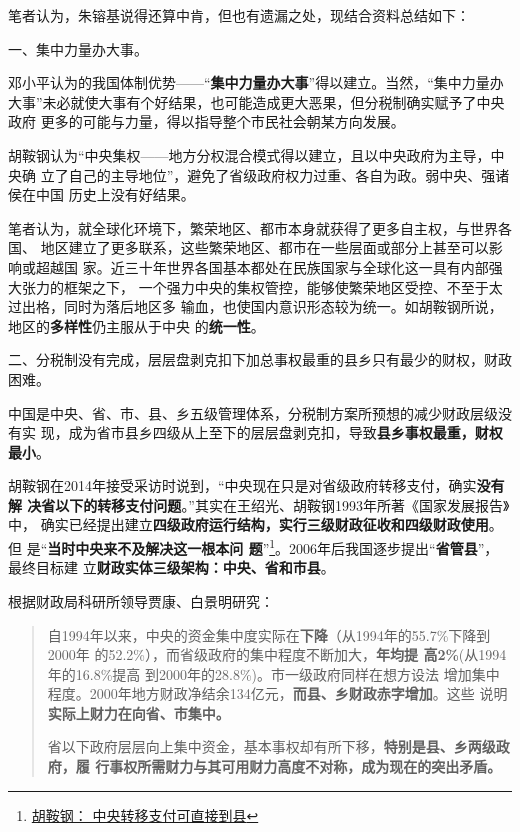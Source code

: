 笔者认为，朱镕基说得还算中肯，但也有遗漏之处，现结合资料总结如下：

{\heiti 一、集中力量办大事。}

邓小平认为的我国体制优势——“\textbf{集中力量办大事}”得以建立。当然，“集中力量办
大事”未必就使大事有个好结果，也可能造成更大恶果，但分税制确实赋予了中央政府
更多的可能与力量，得以指导整个市民社会朝某方向发展。

胡鞍钢认为“中央集权——地方分权混合模式得以建立，且以中央政府为主导，中央确
立了自己的主导地位”，避免了省级政府权力过重、各自为政。弱中央、强诸侯在中国
历史上没有好结果。

笔者认为，就全球化环境下，繁荣地区、都市本身就获得了更多自主权，与世界各国、
地区建立了更多联系，这些繁荣地区、都市在一些层面或部分上甚至可以影响或超越国
家。近三十年世界各国基本都处在民族国家与全球化这一具有内部强大张力的框架之下，
一个强力中央的集权管控，能够使繁荣地区受控、不至于太过出格，同时为落后地区多
输血，也使国内意识形态较为统一。如胡鞍钢所说，地区的\textbf{多样性}仍主服从于中央
的\textbf{统一性}。


{\heiti 二、分税制没有完成，层层盘剥克扣下加总事权最重的县乡只有最少的财权，财政困难。}

中国是中央、省、市、县、乡五级管理体系，分税制方案所预想的减少财政层级没有实
现，成为省市县乡四级从上至下的层层盘剥克扣，导致\textbf{县乡事权最重，财权最小}。

胡鞍钢在2014年接受采访时说到，“中央现在只是对省级政府转移支付，确实\textbf{没有解
  决省以下的转移支付问题}。”其实在王绍光、胡鞍钢1993年所著《国家发展报告》中，
确实已经提出建立\textbf{四级政府运行结构，实行三级财政征收和四级财政使用}。但
是“\textbf{当时中央来不及解决这一根本问
  题}”\footnote{\href{http://business.sohu.com/20140428/n398892838.shtml}{胡鞍钢：
    中央转移支付可直接到县}}。2006年后我国逐步提出“\textbf{省管县}”，最终目标建
立\textbf{财政实体三级架构：中央、省和市县}。


根据财政局科研所领导贾康、白景明研究：
\begin{quotation}
  自1994年以来，中央的资金集中度实际在\textbf{下降}（从1994年的55.7\%下降到2000年
  的52.2\%），而省级政府的集中程度不断加大，\textbf{年均提
    高2\%}(从1994年的16.8\%提高 到2000年的28.8\%)。市一级政府同样在想方设法
  增加集中程度。2000年地方财政净结余134亿元，\textbf{而县、乡财政赤字增加}。这些
  说明\textbf{实际上财力在向省、市集中。}\cite{xianxiangfenshui}

  省以下政府层层向上集中资金，基本事权却有所下移，\textbf{特别是县、乡两级政府，履
    行事权所需财力与其可用财力高度不对称，成为现在的突出矛盾。}
\end{quotation}

